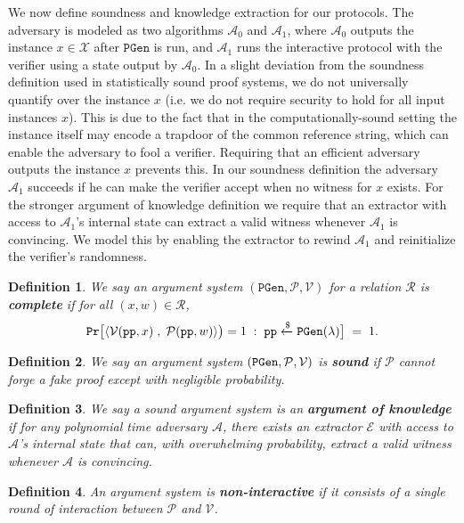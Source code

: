 \documentclass[11pt, lettersize, notitlepage, leqno, footskip=0.6cm]{article}
\newcommand{\ttt}{\texttt}
\newcommand{\mc}{\mathcal}
\newcommand{\lam}{\lambda}
\newcommand{\mP}{\mc{P}}
\newcommand{\A}{\mc{A}}
\newcommand{\V}{\mc{V}}
\newcommand{\vs}{\vspace{-0.15cm}}
\newcommand{\op}{overwhelming probability}
\newcommand{\E}{\mc{E}}
\newtheorem{Def}{Definition}[section]
\numberwithin{equation}{section}
\begin{document}
We now define soundness and knowledge extraction for our protocols. The adversary is modeled as two algorithms $\A_0$ and $\A_1$, where $\A_0$ outputs the instance $x \in \mc{X}$ after $\ttt{PGen}$ is run, and $\A_1$ runs the interactive protocol with the verifier using a state output by $\A_0$. In a slight deviation from the soundness definition used in
statistically sound proof systems, we do not universally quantify over the instance
$x$ (i.e. we do not require security to hold for all input instances $x$). This is due to
the fact that in the computationally-sound setting the instance itself may encode a trapdoor of the common reference string, which can enable the adversary to fool a verifier. Requiring that an efficient adversary outputs the instance $x$ prevents this. In our soundness definition the adversary $\A_1$ succeeds
if he can make the verifier accept when no witness for $x$ exists. For the stronger argument of knowledge definition we require that an extractor with access to $\A_1$'s internal state can extract a valid witness whenever $\A_1$ is convincing. We model this
by enabling the extractor to rewind $\A_1$ and reinitialize the verifier's randomness.



\begin{Def} We say an argument system $(\ttt{PGen}, \mP, \V)$ for a relation $\mc{R}$ is \textbf{complete} if for all $(x,w)\in \mc{R}$, \vs $${\tt{Pr}}\big[\langle \V({\tt{pp}}, x)\;,\; \mP({\tt{pp}}, w)\rangle\big) =1\;:\; {\tt{pp}} \xleftarrow{\$} {\tt{PGen}}(\lam) \big]\; = \; 1. $$ \end{Def}

\begin{Def} We say an argument system $({\tt{PGen}}, \mP, \V)$ is \textbf{sound} if $\mP$ cannot forge a fake proof except with negligible probability. \end{Def}

\begin{Def} We say a sound argument system is an \textbf{argument of knowledge} if for any polynomial time adversary $\A$, there exists an extractor $\E$ with access to $\A$'s internal state that can, with \op, extract a valid witness whenever $\A$ is convincing. \end{Def}

\begin{Def} An argument system is \textbf{non-interactive} if it consists of a single round of interaction between $\mP$ and $\V$.\end{Def}
\end{document}
